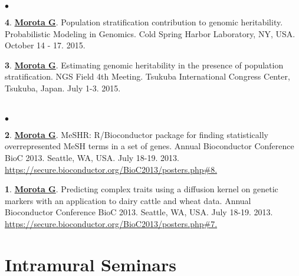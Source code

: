 \documentclass[margin,line,10pt]{res}
\newenvironment{list2}{
  \begin{list}{$\bullet$}{%
      \setlength{\itemsep}{0in}
      \setlength{\parsep}{0in} \setlength{\parskip}{0in}
      \setlength{\topsep}{0in} \setlength{\partopsep}{0in} 
      \setlength{\leftmargin}{0.2in}}}{\end{list}}
\begin{document}
\begin{resume}
\begin{list2}
\item  [{\bf 4}.] \textbf{\underline{Morota G}}. Population stratification contribution to genomic heritability. Probabilistic Modeling in Genomics. Cold Spring Harbor Laboratory, NY, USA. October 14 - 17. 2015.

  \vspace{0.5cm}
  
\item  [{\bf 3}.] \textbf{\underline{Morota G}}.  Estimating genomic heritability in the presence of population stratification. NGS Field 4th Meeting. Tsukuba International Congress Center, Tsukuba, Japan. July 1-3. 2015.
\end{list2}

\section{}
\begin{list2}
\item   [{\bf 2}.]  \textbf{\underline{Morota G}}.  MeSHR: R/Bioconductor package for finding statistically overrepresented  MeSH terms in a set of genes. Annual Bioconductor Conference BioC 2013. Seattle, WA, USA. July 18-19. 2013. \\ \textcolor{blue}{\href{https://secure.bioconductor.org/BioC2013/posters.php\#7}{https://secure.bioconductor.org/BioC2013/posters.php\#8. } }  

\vspace{0.5cm}

\item  [{\bf 1}.] \textbf{\underline{Morota G}}. Predicting complex traits using a diffusion kernel on genetic markers with an application to dairy cattle and wheat data. Annual Bioconductor Conference BioC 2013. Seattle, WA, USA. July 18-19. 2013. \textcolor{blue}{\href{https://secure.bioconductor.org/BioC2013/posters.php\#7}{https://secure.bioconductor.org/BioC2013/posters.php\#7. } }  
\end{list2}











\vspace{0.5cm}
\section{\sc Intramural Seminars}
\vspace{1cm}


\end{resume}
\end{document}
